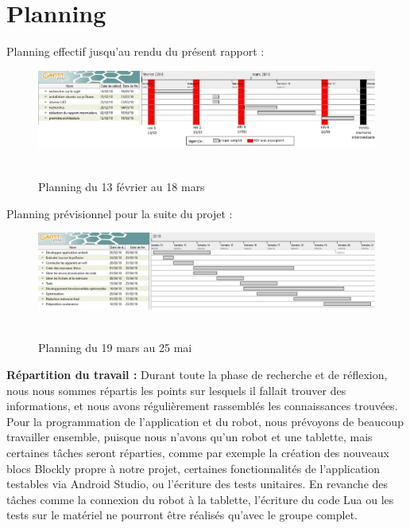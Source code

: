 \documentclass[12pt,francais]{report}
\begin{document}
\chapter*{Planning}

Planning effectif jusqu'au rendu du présent rapport :\\
\begin{figure}[!h]
\begin{addmargin}[-7em]{1em}
\includegraphics[scale=0.6]{./images/intermediaireEffectif.jpg}~\\[1.5cm]
\caption{Planning du 13 février au 18 mars}
\end{addmargin}
\end{figure}

\newpage
Planning prévisionnel pour la suite du projet :\\
\begin{figure}[!h]
\begin{addmargin}[-8em]{1em}
\includegraphics[scale=0.6]{./images/previsionnel.jpg}~\\[1.5cm]
\caption{Planning du 19 mars au 25 mai}
\end{addmargin}
\end{figure}

\textbf{Répartition du travail :}
Durant toute la phase de recherche et de réflexion, nous nous sommes répartis les points sur lesquels il fallait trouver des informations, et nous avons régulièrement rassemblés les connaissances trouvées.
Pour la programmation de l'application et du robot, nous prévoyons de beaucoup travailler ensemble, puisque nous n'avons qu'un robot et une tablette, mais certaines tâches seront réparties, comme par exemple la création des nouveaux blocs Blockly propre à notre projet, certaines fonctionnalités de l'application testables via Android Studio, ou l'écriture des tests unitaires. En revanche des tâches comme la connexion du robot à la tablette, l'écriture du code Lua ou les tests sur le matériel ne pourront être réalisés qu'avec le groupe complet.




\end{document}
